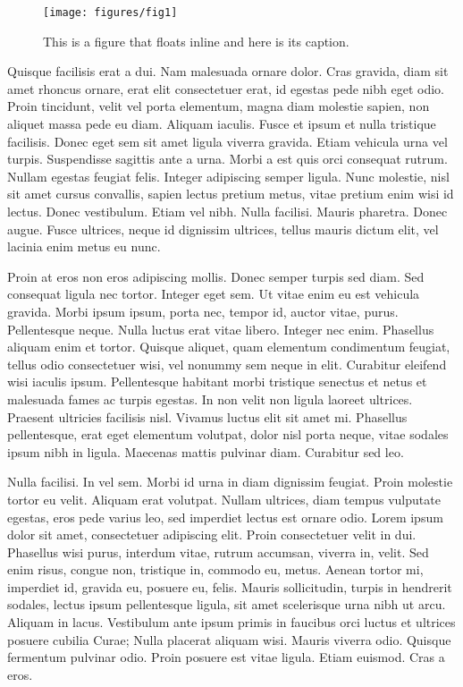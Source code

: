 \begin{figure} \texttt{[image: figures/fig1]} \caption[Short
	figure name.]{This is a figure that floats inline and here is its
		caption.  \label{fig:myInlineFigure}} \end{figure}


Quisque facilisis erat a dui. Nam malesuada ornare dolor. Cras gravida, diam
sit amet rhoncus ornare, erat elit consectetuer erat, id egestas pede nibh eget
odio. Proin tincidunt, velit vel porta elementum, magna diam molestie sapien,
non aliquet massa pede eu diam. Aliquam iaculis. Fusce et ipsum et nulla
tristique facilisis. Donec eget sem sit amet ligula viverra gravida. Etiam
vehicula urna vel turpis. Suspendisse sagittis ante a urna. Morbi a est quis
orci consequat rutrum. Nullam egestas feugiat felis. Integer adipiscing semper
ligula. Nunc molestie, nisl sit amet cursus convallis, sapien lectus pretium
metus, vitae pretium enim wisi id lectus. Donec vestibulum. Etiam vel nibh.
Nulla facilisi. Mauris pharetra. Donec augue. Fusce ultrices, neque id
dignissim ultrices, tellus mauris dictum elit, vel lacinia enim metus eu nunc.

Proin at eros non eros adipiscing mollis. Donec semper turpis sed diam. Sed
consequat ligula nec tortor. Integer eget sem. Ut vitae enim eu est vehicula
gravida. Morbi ipsum ipsum, porta nec, tempor id, auctor vitae, purus.
Pellentesque neque. Nulla luctus erat vitae libero. Integer nec enim. Phasellus
aliquam enim et tortor. Quisque aliquet, quam elementum condimentum feugiat,
tellus odio consectetuer wisi, vel nonummy sem neque in elit. Curabitur
eleifend wisi iaculis ipsum. Pellentesque habitant morbi tristique senectus et
netus et malesuada fames ac turpis egestas. In non velit non ligula laoreet
ultrices. Praesent ultricies facilisis nisl. Vivamus luctus elit sit amet mi.
Phasellus pellentesque, erat eget elementum volutpat, dolor nisl porta neque,
vitae sodales ipsum nibh in ligula. Maecenas mattis pulvinar diam. Curabitur
sed leo.

Nulla facilisi. In vel sem. Morbi id urna in diam dignissim feugiat. Proin
molestie tortor eu velit. Aliquam erat volutpat. Nullam ultrices, diam tempus
vulputate egestas, eros pede varius leo, sed imperdiet lectus est ornare odio.
Lorem ipsum dolor sit amet, consectetuer adipiscing elit. Proin consectetuer
velit in dui. Phasellus wisi purus, interdum vitae, rutrum accumsan, viverra
in, velit. Sed enim risus, congue non, tristique in, commodo eu, metus. Aenean
tortor mi, imperdiet id, gravida eu, posuere eu, felis. Mauris sollicitudin,
turpis in hendrerit sodales, lectus ipsum pellentesque ligula, sit amet
scelerisque urna nibh ut arcu. Aliquam in lacus. Vestibulum ante ipsum primis
in faucibus orci luctus et ultrices posuere cubilia Curae; Nulla placerat
aliquam wisi. Mauris viverra odio. Quisque fermentum pulvinar odio. Proin
posuere est vitae ligula. Etiam euismod. Cras a eros.

